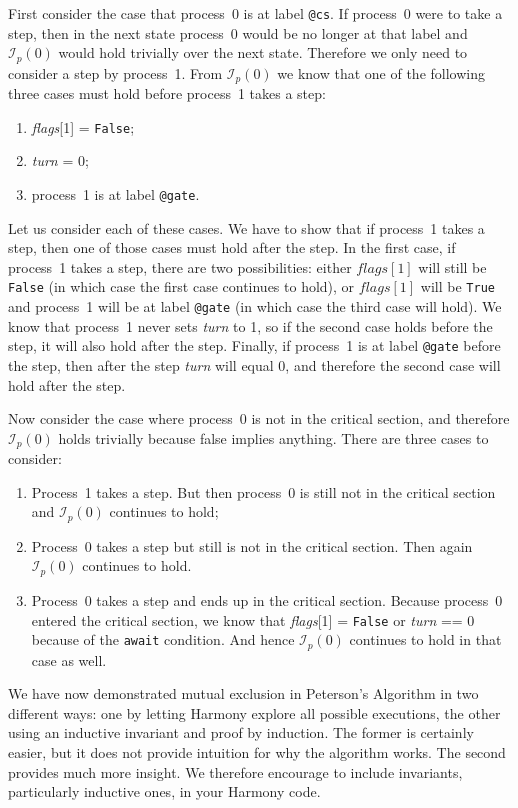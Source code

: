 \documentclass{report}
\begin{document}
First consider the case that process~0 is at label \texttt{@cs}.  If process~0
were to take a step, then in the next state process~0 would be no longer
at that label and $\mathcal{I}_p(0)$ would hold trivially over the next state.
Therefore we only need to consider a step by process~1.
%
From $\mathcal{I}_p(0)$ we know that one of the following three cases must hold before
process~1 takes a step:
\begin{enumerate}
\item \textit{flags}[1] = \texttt{False};
\item \textit{turn} = 0;
\item process~1 is at label \texttt{@gate}.
\end{enumerate}

Let us consider each of these cases.
We have to show that if process~1 takes a step, then one of those
cases must hold after the step.
In the first case, if process~1 takes a step, there are two possibilities:
either $flags[1]$ will still be \texttt{False} (in which case the first case
continues to hold), or $flags[1]$ will be \texttt{True}
and process~1 will be at label \texttt{@gate} (in which case the third case
will hold).
We know that process~1 never sets \textit{turn} to 1, so
if the second case holds before the step, it will also hold after the step.
Finally, if process~1 is at label \texttt{@gate} before the step, then after
the step \textit{turn} will equal 0, and therefore the second case will hold
after the step.

Now consider the case where process~0 is not in the critical section,
and therefore $\mathcal{I}_p(0)$ holds trivially because false implies
anything.
There are three cases to consider:
\begin{enumerate}
\item Process~1 takes a step.  But then process~0 is still not in the critical
section and $\mathcal{I}_p(0)$ continues to hold;
\item Process~0 takes a step but still is not in the critical section.
Then again $\mathcal{I}_p(0)$ continues to hold.
\item Process~0 takes a step and ends up in the critical section.
Because process~0 entered the critical section, we know that
\textit{flags}[1] = \texttt{False} or \textit{turn} == 0 because
of the \texttt{await} condition.
And hence $\mathcal{I}_p(0)$ continues to hold in that case as well.
\end{enumerate}

We have now demonstrated mutual exclusion in Peterson's Algorithm in two
different ways: one by letting Harmony explore all possible executions, the
other using an inductive invariant and proof by induction.  The former
is certainly easier, but it does not provide intuition for why the
algorithm works.  The second provides much more insight.  We therefore
encourage to include invariants, particularly inductive ones, in your
Harmony code.
\end{document}
